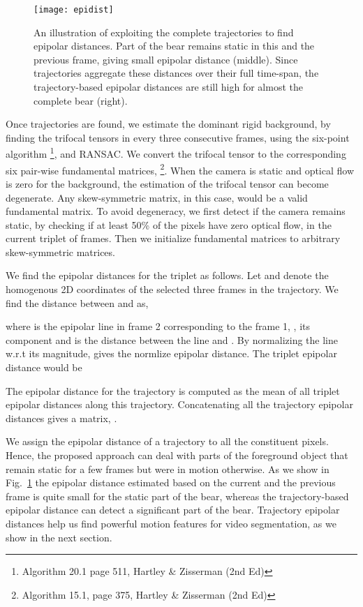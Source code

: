 \documentclass[10pt,twocolumn,letterpaper]{article}
\begin{document}
\begin{figure}[t]
\centering
\texttt{[image: epidist]}
\caption{An illustration of exploiting the complete trajectories to find epipolar distances. Part of the bear remains static in this and the previous frame, giving small epipolar distance (middle). Since trajectories aggregate these distances over their full time-span, the trajectory-based epipolar distances are still high for almost the complete bear (right).}
\vspace{-0.5cm}
\label{fig:epipolarDistance}
\end{figure}

Once trajectories are found, we estimate the dominant rigid background, by finding the trifocal tensors in every three consecutive frames, using the six-point algorithm \cite{hartley2003multiple}\footnote{Algorithm 20.1 page 511, Hartley \& Zisserman (2nd Ed)}, and RANSAC. We convert the trifocal tensor to the corresponding six pair-wise fundamental matrices,  \cite{hartley2003multiple}\footnote{Algorithm 15.1, page 375, Hartley \& Zisserman (2nd Ed)}. When the camera is static and optical flow is zero for the background, the estimation of the trifocal tensor can become degenerate. Any skew-symmetric matrix, in this case, would be a valid fundamental matrix. To avoid degeneracy, we first detect if the camera remains static, by checking if at least 50\% of the pixels have zero optical flow, in the current triplet of frames. Then we initialize fundamental matrices to arbitrary skew-symmetric matrices. 

We find the epipolar distances for the triplet as follows. Let  and  denote the homogenous 2D coordinates of the selected three frames in the  trajectory. We find the distance between  and  as,
\vspace{-0.1cm}

where  is the epipolar line in frame 2 corresponding to the frame 1, , its  component and  is the distance between the line and . By normalizing the line w.r.t its magnitude, gives the normlize epipolar distance. The triplet epipolar distance would be
\vspace{-0.1cm}

The epipolar distance for the trajectory  is computed as the mean of all triplet epipolar distances along this trajectory. Concatenating all the trajectory epipolar distances gives a  matrix, .


We assign the epipolar distance of a trajectory to all the constituent pixels. Hence, the proposed approach can deal with parts of the foreground object that remain static for a few frames but were in motion otherwise. As we show in Fig.~\ref{fig:epipolarDistance} the epipolar distance estimated based on the current and the previous frame is quite small for the static part of the bear, whereas the trajectory-based epipolar distance can detect a significant part of the bear. Trajectory epipolar distances help us find powerful motion features for video segmentation, as we show in the next section.
\end{document}
